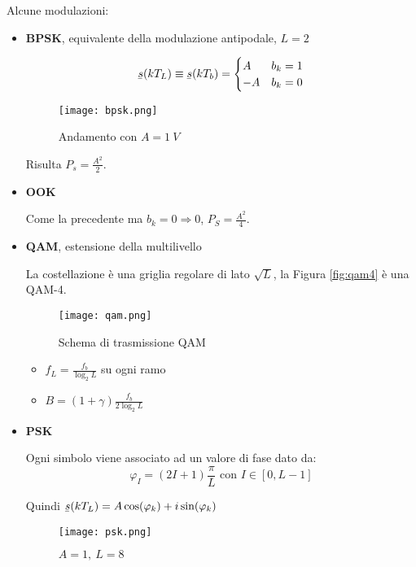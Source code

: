 \documentclass{article}
\newcommand{\ubar}[1]{\underaccent{\bar}{#1}}
\begin{document}
\noindent Alcune modulazioni:
\begin{itemize}
    \item \textbf{BPSK}, equivalente della modulazione antipodale, $L=2$

        \[\ubar{s}(kT_L)\equiv\ubar{s}(kT_b)=\begin{cases}
            A & b_k=1\\
            -A & b_k=0
        \end{cases}\]

        \begin{figure}[ht]
            \centering
            \texttt{[image: bpsk.png]}
            \caption{Andamento con $A=1\ V$}
        \end{figure}

    Risulta $P_s=\frac{A^2}{2}$.

    \item \textbf{OOK}

        Come la precedente ma $b_k=0\Rightarrow0$, $P_S=\frac{A^2}{4}$.

    \item \textbf{QAM}, estensione della multilivello

        La costellazione è una griglia regolare di lato $\sqrt{L}$, la Figura \ref{fig:qam4} è una QAM-4.

    \begin{figure}[ht]
        \centering
        \texttt{[image: qam.png]}
        \caption{Schema di trasmissione QAM}
    \end{figure}

    \begin{itemize}
        \item $f_L=\displaystyle\frac{f_b}{\log_2L}$ su ogni ramo
        \item $B=(1+\gamma)\displaystyle\frac{f_b}{2\log_2L}$
    \end{itemize}

    \item \textbf{PSK}

        Ogni simbolo viene associato ad un valore di fase dato da:
        $$\varphi_I=(2I+1)\frac{\pi}{L}\text{ con } I\in[0,L-1]$$

        Quindi $\ubar{s}(kT_L)=A\cos(\varphi_k)+i\sin(\varphi_k)$

    \begin{figure}[ht]
        \centering
        \texttt{[image: psk.png]}
        \caption{$A=1,\ L=8$}
    \end{figure}


\end{itemize}
\end{document}
